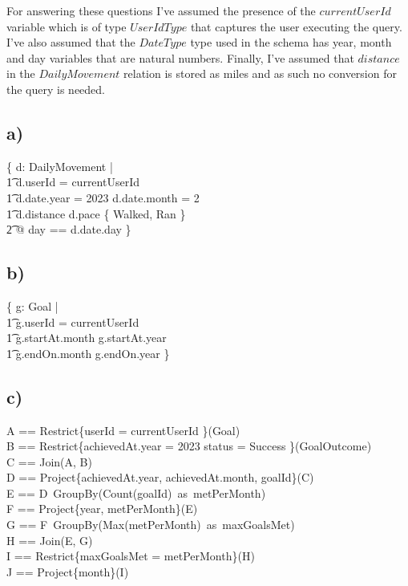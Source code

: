 \documentclass{article}
\begin{document}
For answering these questions I've assumed the presence of the $currentUserId$ variable which is of type $UserIdType$ that captures the user executing the query. I've also assumed that the $DateType$ type used in the schema has year, month and day variables that are natural numbers. Finally, I've assumed that $distance$ in the $DailyMovement$ relation is stored as miles and as such no conversion for the query is needed.

\subsection*{\small a)}

\begin{zed}
\{ d: DailyMovement | \\
    \t1 d.userId = currentUserId \land \\
    \t1 d.date.year = 2023 \land d.date.month = 2 \land \\
    \t1 d.distance  \land d.pace \in \{ Walked, Ran \} \\
        \t2 @ \lblot day == d.date.day \rblot \}
\end{zed}

\subsection*{\small b)}
\begin{zed}
\{ g: Goal | \\
    \t1 g.userId = currentUserId \land \\
    \t1 g.startAt.month  \land g.startAt.year  \\
    \t1 g.endOn.month  \land g.endOn.year  \} \\
\end{zed}

\subsection*{\small c)}
\begin{zed}
A == Restrict\{userId = currentUserId \}(Goal) \\
B == Restrict\{achievedAt.year = 2023 \land status = Success \}(GoalOutcome) \\
C == Join(A, B) \\
D == Project\{achievedAt.year, achievedAt.month, goalId\}(C) \\
E == D\ GroupBy(Count(goalId)\ as\ metPerMonth) \\
F == Project\{year, metPerMonth\}(E) \\
G == F\ GroupBy(Max(metPerMonth)\ as\ maxGoalsMet) \\
H == Join(E, G) \\ 
I == Restrict\{maxGoalsMet = metPerMonth\}(H) \\
J == Project\{month\}(I) \\
\end{zed}
\end{document}
